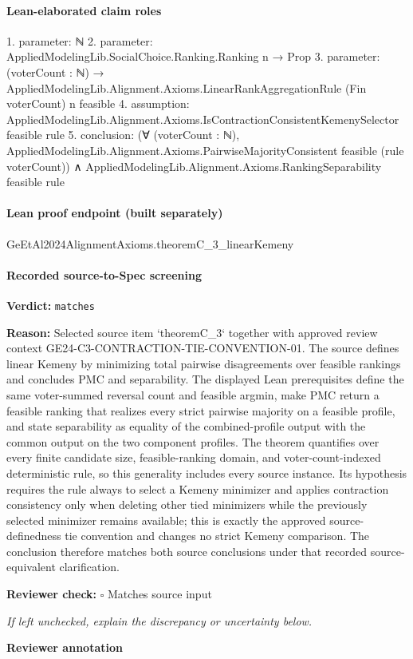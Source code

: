 \documentclass[10pt]{article}
\newcommand{\reviewerbox}{%
  \par\noindent\fbox{\parbox{0.96\linewidth}{\rule{0pt}{0.38in}}}\par
}
\newcommand{\reviewmatch}[1]{%
  \par\noindent\textbf{Reviewer check:} $\square$\; #1\par
  \noindent\emph{If left unchecked, explain the discrepancy or uncertainty below.}\par
}
\begin{document}
\paragraph{Lean-elaborated claim roles}\begin{ReviewVerbatim}
1. parameter: ℕ
2. parameter: AppliedModelingLib.SocialChoice.Ranking.Ranking n → Prop
3. parameter: (voterCount : ℕ) → AppliedModelingLib.Alignment.Axioms.LinearRankAggregationRule (Fin voterCount) n feasible
4. assumption: AppliedModelingLib.Alignment.Axioms.IsContractionConsistentKemenySelector feasible rule
5. conclusion: (∀ (voterCount : ℕ), AppliedModelingLib.Alignment.Axioms.PairwiseMajorityConsistent feasible (rule voterCount)) ∧
  AppliedModelingLib.Alignment.Axioms.RankingSeparability feasible rule
\end{ReviewVerbatim}

\paragraph{Lean proof endpoint (built separately)}\begin{ReviewVerbatim}
GeEtAl2024AlignmentAxioms.theoremC_3_linearKemeny
\end{ReviewVerbatim}

\paragraph{Recorded source-to-Spec screening}
\textbf{Verdict:} \texttt{matches}
\\
{\raggedright
\textbf{Reason:} Selected source item `theoremC\_\allowbreak{}3` together with approved review context GE24-\allowbreak{}C3-\allowbreak{}CONTRACTION-\allowbreak{}TIE-\allowbreak{}CONVENTION-\allowbreak{}01.\allowbreak{} The source defines linear Kemeny by minimizing total pairwise disagreements over feasible rankings and concludes PMC and separability.\allowbreak{} The displayed Lean prerequisites define the same voter-\allowbreak{}summed reversal count and feasible argmin, make PMC return a feasible ranking that realizes every strict pairwise majority on a feasible profile, and state separability as equality of the combined-\allowbreak{}profile output with the common output on the two component profiles.\allowbreak{} The theorem quantifies over every finite candidate size, feasible-\allowbreak{}ranking domain, and voter-\allowbreak{}count-\allowbreak{}indexed deterministic rule, so this generality includes every source instance.\allowbreak{} Its hypothesis requires the rule always to select a Kemeny minimizer and applies contraction consistency only when deleting other tied minimizers while the previously selected minimizer remains available;\allowbreak{} this is exactly the approved source-\allowbreak{}definedness tie convention and changes no strict Kemeny comparison.\allowbreak{} The conclusion therefore matches both source conclusions under that recorded source-\allowbreak{}equivalent clarification.\allowbreak{}
\par}
\reviewmatch{Matches source input}
\noindent\textbf{Reviewer annotation}\par
\reviewerbox
\clearpage
\hypertarget{source-claim-aba4949a527a8006}{}
\end{document}
